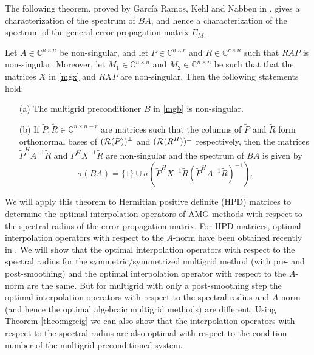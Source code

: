 \documentclass[final]{siamltex}
\newcommand{\innCnn}{\in\mathbb{C}^{n\times n}}
\newcommand{\innCrn}{\in\mathbb{C}^{r\times n}}
\newcommand{\innCnr}{\in\mathbb{C}^{n\times r}}
\newcommand{\beqo}{\begin{eqnarray*}}
\newcommand{\eeqo}{\end{eqnarray*}}
\numberwithin{equation}{section}
\newcommand{\im} {{\cal R}}
\newcommand{\bC}{\mathbb{C}}
\begin{document}


The following theorem, proved by Garc{\'i}a Ramos, Kehl  and Nabben in
\cite{GarKN18},
gives a characterization of the spectrum of $BA$, and hence a
characterization of the spectrum of the general error propagation matrix $E_M$.
\begin{theorem} \label{theo:mg:eig}
Let $A \innCnn$ be  non-singular, and let   $P \innCnr $ and  $R \innCrn $ such
that $RAP$ is non-singular. Moreover, let $M_1 \innCnn$ and $M_2 \innCnn $ be
such  that  that the matrices $X$ in \eqref{mgx} and $RXP$ are  non-singular.
Then the following statements hold:
\begin{enumerate}
\item[(a)] The multigrid preconditioner $B$ in
\eqref{mgb}  is non-singular. 

\item[(b)] If $\tilde P, \tilde R \in \bC^{n \times n-r}$ are matrices
such that the columns  of
$\tilde P$ and $\tilde R $ form  orthonormal  bases of $(\im (P))^\perp$ and
$(\im (R^{H}))^\perp$ respectively, then the matrices $\tilde P^HA^{-1}\tilde
R$ and $P^HX^{-1}\tilde R$
are
non-singular
and the spectrum of
$BA$  is given by
\[\sigma(BA) = \{1\} \cup \sigma(\tilde P^HX^{-1}\tilde R (\tilde
P^HA^{-1}\tilde
R)^{-1}).\]

\end{enumerate}
\end{theorem}

We will apply this theorem to Hermitian positive definite (HPD)  matrices to
determine
the
optimal interpolation operators of AMG methods with respect to
the
spectral radius of the error propagation matrix.
For HPD 
matrices, optimal interpolation  operators with respect to the
$A$-norm have been obtained recently in \cite{XuZ17, Bra18}.
We will show that the optimal interpolation operators with respect to the
spectral
radius
for
the
symmetric/symmetrized
multigrid
method
(with
pre-
and
post-smoothing) and
the
optimal
interpolation operator with respect to the $A$-norm are the same. But for
multigrid
with
only
a
post-smoothing step
the optimal interpolation operators with respect to the spectral radius and
$A$-norm
(and
hence
the
optimal
algebraic
multigrid
methods)
are  different. Using Theorem \ref{theo:mg:eig} we can also show that the 
interpolation operators with respect to the spectral radius are also optimal 
with
respect to the condition number of the multigrid preconditioned system. 
\end{document}
